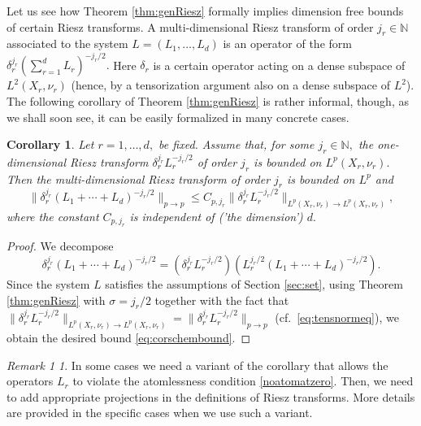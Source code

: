 \documentclass[leqno,12pt]{amsart}
\newtheorem{cor}[thm]{Corollary}
\theoremstyle{definition}
\theoremstyle{remark}
\newtheorem*{remark1}{Remark 1}
\begin{document}
      Let us see how Theorem \ref{thm:genRiesz} formally implies dimension free bounds of certain Riesz transforms. A multi-dimensional Riesz transform of order $j_r\in\mathbb{N}$ associated to the system $L=(L_1,\ldots,L_d)$ is an operator of the form $\delta_r^{j_r}(\sum_{r=1}^d L_r)^{-j_r/2}.$ Here $\delta_r$ is a certain operator acting on a dense subspace of $L^2(X_r,\nu_r)$ (hence, by a tensorization argument also on a dense subspace of $L^2$). The following corollary of Theorem \ref{thm:genRiesz} is rather informal, though, as we shall soon see, it can be easily formalized in many concrete cases.

     \begin{cor}
     \label{cor:Scheme}
     Let $r=1,\ldots,d,$ be fixed. Assume that, for some $j_r \in \mathbb{N},$ the one-dimensional Riesz transform $\delta_r^{j_r} L_r^{-j_r/2}$ of order $j_r$ is bounded on $L^p(X_r,\nu_r).$ Then the multi-dimensional Riesz transform of order $j_r$ is bounded on $L^p$ and
      \begin{equation}
      \label{eq:corschembound}
      \|\delta_r^{j_r}(L_1+\cdots+L_d)^{-j_r/2}\|_{p\to p}\leq C_{p,j_r}\|\delta_r^{j_r}L_r^{-j_r/2}\|_{L^p(X_r,\nu_r)\to L^p(X_r,\nu_r)},\end{equation}
      where the constant $C_{p,j_r}$ is independent of ('the dimension') $d.$
       \end{cor}
     \begin{proof}
     We decompose
      \begin{equation*}
      
      \delta_r^{j_r}(L_1+\cdots+L_d)^{-j_r/2}=(\delta_r^{j_r}L_r^{-j_r/2})(L_r^{j_r/2}(L_1+\cdots+L_d)^{-j_r/2}).
      \end{equation*}
      Since the system $L$ satisfies the assumptions of Section \ref{sec:set}, using Theorem \ref{thm:genRiesz} with $\sigma=j_r/2$ together with the fact that $\|\delta_r^{j_r} L_r^{-j_r/2}\|_{L^p(X_r,\nu_r)\to L^p(X_r,\nu_r)}=\|\delta_r^{j_r} L_r^{-j_r/2}\|_{p \to p}$ (cf.\ \eqref{eq:tensnormeq}), we obtain the desired bound \eqref{eq:corschembound}.
     \end{proof}
\begin{remark1}
In some cases we need a variant of the corollary that allows the operators $L_r$ to violate the atomlessness condition \eqref{noatomatzero}. Then, we need to add appropriate projections in the definitions of Riesz transforms. More details are provided in the specific cases when we use such a variant.
\end{remark1}
\end{document}
